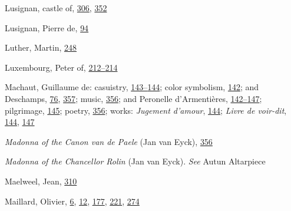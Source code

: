 Lusignan, castle of,
\protect\hyperlink{20_ILLUSTRATIONS_FOLLOW_PAGE.xhtmlux5cux23page_306}{306},
\protect\hyperlink{21_Chapter_Thirteen__IMAGE_AND_WORD.xhtmlux5cux23page_352}{352}

Lusignan, Pierre de,
\protect\hyperlink{10_Chapter_Three__THE_HEROIC_DREAM.xhtmlux5cux23page_94}{94}

Luther, Martin,
\protect\hyperlink{16_Chapter_Nine__THE_DECLINE_OF_SYM.xhtmlux5cux23page_248}{248}

Luxembourg, Peter of,
\protect\hyperlink{14_Chapter_Seven__THE_PIOUS_PERSONA.xhtmlux5cux23page_212}{212--}\protect\hyperlink{14_Chapter_Seven__THE_PIOUS_PERSONA.xhtmlux5cux23page_214}{214}

Machaut, Guillaume de: casuistry,
\protect\hyperlink{11_Chapter_Four__THE_FORMS_OF_LOVE.xhtmlux5cux23page_143}{143--}\protect\hyperlink{11_Chapter_Four__THE_FORMS_OF_LOVE.xhtmlux5cux23page_144}{144};
color symbolism,
\protect\hyperlink{11_Chapter_Four__THE_FORMS_OF_LOVE.xhtmlux5cux23page_142}{142};
and Deschamps,
\protect\hyperlink{10_Chapter_Three__THE_HEROIC_DREAM.xhtmlux5cux23page_76}{76},
\protect\hyperlink{21_Chapter_Thirteen__IMAGE_AND_WORD.xhtmlux5cux23page_357}{357};
music,
\protect\hyperlink{21_Chapter_Thirteen__IMAGE_AND_WORD.xhtmlux5cux23page_356}{356};
and Peronelle d'Armentières,
\protect\hyperlink{11_Chapter_Four__THE_FORMS_OF_LOVE.xhtmlux5cux23page_142}{142--}\protect\hyperlink{11_Chapter_Four__THE_FORMS_OF_LOVE.xhtmlux5cux23page_147}{147};
pilgrimage,
\protect\hyperlink{11_Chapter_Four__THE_FORMS_OF_LOVE.xhtmlux5cux23page_145}{145};
poetry,
\protect\hyperlink{21_Chapter_Thirteen__IMAGE_AND_WORD.xhtmlux5cux23page_356}{356};
works: \emph{Jugement d'amour},
\protect\hyperlink{11_Chapter_Four__THE_FORMS_OF_LOVE.xhtmlux5cux23page_144}{144};
\emph{Livre de voir-dit},
\protect\hyperlink{11_Chapter_Four__THE_FORMS_OF_LOVE.xhtmlux5cux23page_144}{144},
\protect\hyperlink{11_Chapter_Four__THE_FORMS_OF_LOVE.xhtmlux5cux23page_147}{147}

\emph{Madonna of the Canon van de Paele} (Jan van Eyck),
\protect\hyperlink{21_Chapter_Thirteen__IMAGE_AND_WORD.xhtmlux5cux23page_356}{356}

\emph{Madonna of the Chancellor Rolin} (Jan van Eyck). \emph{See} Autun
Altarpiece

Maelweel, Jean,
\protect\hyperlink{20_ILLUSTRATIONS_FOLLOW_PAGE.xhtmlux5cux23page_310}{310}

Maillard, Olivier,
\protect\hyperlink{08_Chapter_One__THE_PASSIONATE_INTE.xhtmlux5cux23page_6}{6},
\protect\hyperlink{08_Chapter_One__THE_PASSIONATE_INTE.xhtmlux5cux23page_12}{12},
\protect\hyperlink{13_Chapter_Six__THE_DEPICTION_OF_TH.xhtmlux5cux23page_177}{177},
\protect\hyperlink{15_Chapter_Eight__RELIGIOUS_EXCITAT.xhtmlux5cux23page_221}{221},
\protect\hyperlink{18_Chapter_Eleven__THE_FORMS_OF_THO.xhtmlux5cux23page_274}{274}

